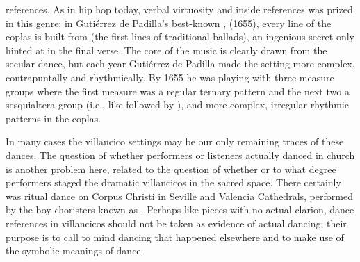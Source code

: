 references.
As in hip hop today, verbal virtuosity and inside references was prized in this
genre; in Gutiérrez de Padilla's best-known ,  (1655), every line of the coplas is built from  (the first lines of traditional  ballads), an
ingenious secret only hinted at in the final verse.
The core of the music is clearly drawn from the secular dance, but each year
Gutiérrez de Padilla made the setting more complex, contrapuntally and
rhythmically.
By 1655 he was playing with three-measure groups where the first measure was a
regular ternary pattern and the next two a sesquialtera group (i.e., like
 followed by ), and more complex, irregular rhythmic
patterns in the coplas.

In many cases the villancico settings may be our only remaining traces of these
dances.
The question of whether performers or listeners actually danced in church is
another problem here, related to the question of whether or to what degree
performers staged the dramatic villancicos in the sacred space.%
    \citXXX[?]
There certainly was ritual dance on Corpus Christi in Seville and Valencia
Cathedrals, performed by the boy choristers known as .%
    \Autocite{Comes:Danzas}
Perhaps like  pieces with no actual clarion, dance references in
villancicos should not be taken as evidence of actual dancing; their purpose is
to call to mind dancing that happened elsewhere and to make use of the symbolic
meanings of dance. %
	
